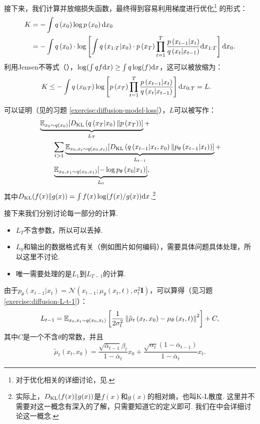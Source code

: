 接下来，我们计算并放缩损失函数，最终得到容易利用梯度进行优化\footnote{对于优化相关的详细讨论，见. }
    的形式：
\[
\begin{aligned}
    K & =-\int q\left(x_{0}\right) \log p\left(x_{0}\right) \mathrm{d} x_{0} \\
    & =-\int q\left(x_{0}\right) \cdot \log \left[\int q\left(x_{1:T} | x_{0}\right) \cdot p\left(x_{T}\right) \prod_{t=1}^T \frac{p\left(x_{t-1} | x_{t}\right)}{q\left(x_{t} | x_{t-1}\right)}\mathrm{d} x_{1:T}\right]\mathrm{d} x_{0}.
\end{aligned}
\]
利用Jensen不等式（），$\log(\int q f\mathrm{d} x)\geq\int q\log(f)\mathrm{d} x$，这可以被放缩为：
\[
\begin{aligned}
    K \leq & -\int q\left(x_{0:T}\right) \log \left[p\left(x_{T}\right) \prod_{t=1}^T \frac{p\left(x_{t-1} | x_{t}\right)}{q\left(x_{t} | x_{t-1}\right)}\right] \mathrm{d} x_{0:T}=L.
\end{aligned}
\]

可以证明（见的习题 \ref{exercise:diffusion-model-loss}），$L$可以被写作：
\[
\begin{aligned}
    &\underbrace{\mathbb{E}_{x_0\sim q(x_0)}[D_{\mathrm{KL}}\left(q\left(x_T | x_0\right) \| p\left(x_T\right)\right)]}_{L_T}+\\
    &\qquad\sum_{t>1} \underbrace{\mathbb{E}_{x_0,x_t\sim q(x_0,x_t)}[D_{\mathrm{KL}}\left(q\left(x_{t-1} | x_t, x_0\right) \| p_\theta\left(x_{t-1} | x_t\right)\right)]}_{L_{t-1}}+\\
    &\qquad\underbrace{\mathbb{E}_{x_0,x_1\sim q(x_0,x_1)}[-\log p_\theta\left(x_0 | x_1\right)]}_{L_0},
\end{aligned}
\]
其中$D_{\mathrm{KL}}(f(x)\|g(x))=\int f(x)\log(f(x)/g(x))\mathrm{d} x$.\footnote{实际上，$D_{\mathrm{KL}}(f(x)\|g(x))$是$f(x)$和$g(x)$的相对熵，也叫K-L散度. 这里并不需要对这一概念有深入的了解，只需要知道它的定义即可. 我们在中会详细讨论这一概念. }

接下来我们分别讨论每一部分的计算. 
\begin{itemize}
    \item $L_T$不含参数，所以可以丢掉. 
    \item $L_0$和输出的数据格式有关（例如图片如何编码），需要具体问题具体处理，所以这里不讨论. 
    \item 唯一需要处理的是$L_1$到$L_{T-1}$的计算. 
\end{itemize}

由于$p_\theta\left(x_{t-1}|x_t\right)=\mathcal{N}\left(x_{t-1} ; \mu_\theta\left(x_t, t\right), \sigma_t^2 \mathbf{I}\right)$，可以算得（见习题 \ref{exercise:diffusion-L-t-1}）：
\begin{equation}
L_{t-1}=\mathbb{E}_{x_0,x_t\sim q(x_0,x_t)}\left[\frac{1}{2 \sigma_t^2}\left\|\tilde{\mu}_t\left(x_t, x_0\right)-\mu_\theta\left(x_t, t\right)\right\|^2\right]+C,\label{eq:diffusion-L-t-1}
\end{equation}
其中$C$是一个不含$\theta$的常数，并且
\[
\tilde{\mu}_t\left(x_t, x_0\right)=\frac{\sqrt{\bar{\alpha}_{t-1}} \beta_t}{1-\bar{\alpha}_t} x_0+\frac{\sqrt{\alpha_t}\left(1-\bar{\alpha}_{t-1}\right)}{1-\bar{\alpha}_t} x_t.
\]

